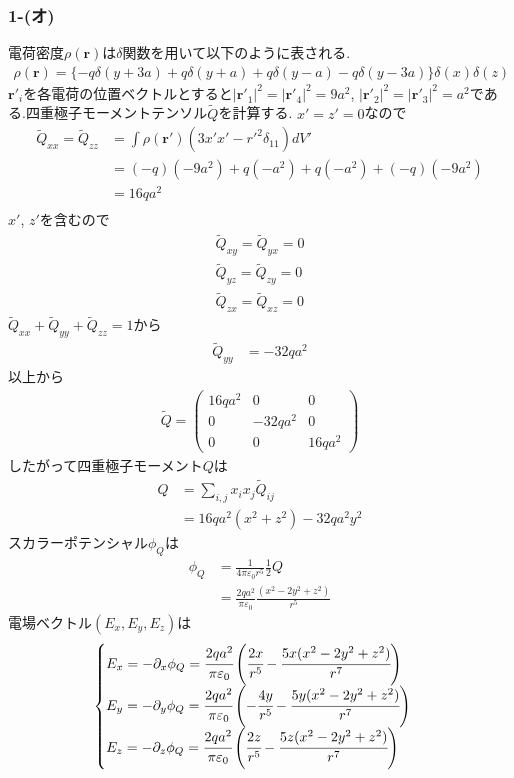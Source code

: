 \subsubsection*{1-(オ)}
電荷密度$\rho({\bm r})$は$\delta$関数を用いて以下のように表される.
\begin{align*}
  \rho({\bm r})=\{-q\delta(y+3a)+q\delta(y+a)+q\delta(y-a)-q\delta(y-3a)\}\delta(x)\delta(z)
\end{align*}
${\bm r'_i}$を各電荷の位置ベクトルとすると$|{\bm r'}_1|^2=|{\bm r'}_4|^2=9a^2$, $|{\bm r'}_2|^2=|{\bm r'}_3|^2=a^2$である.四重極子モーメントテンソル$\tilde{Q}$を計算する.
$x'=z'=0$なので
\begin{align*}
  \tilde{Q}_{xx} =\tilde{Q}_{zz} & =\int\rho({\bm r'})(3x'x'-{r'}^2\delta_{11})dV' \\
                                 & =(-q)(-9a^2)+q(-a^2)+q(-a^2)+(-q)(-9a^2)        \\
                                 & =16qa^2                                         \\
\end{align*}
$x'$, $z'$を含むので
\begin{align*}
  \tilde{Q}_{xy}=\tilde{Q}_{yx}=0 \\
  \tilde{Q}_{yz}=\tilde{Q}_{zy}=0 \\
  \tilde{Q}_{zx}=\tilde{Q}_{xz}=0
\end{align*}
$\tilde{Q}_{xx}+\tilde{Q}_{yy}+\tilde{Q}_{zz}=1$から
\begin{align*}
  \tilde{Q}_{yy} & =-32qa^2
\end{align*}
以上から
\begin{align*}
  \tilde{Q}=\left(
  \begin{array}{ccc}
      16qa^2 & 0       & 0      \\
      0      & -32qa^2 & 0      \\
      0      & 0       & 16qa^2
    \end{array}
  \right)
\end{align*}
したがって四重極子モーメント$Q$は
\begin{align*}
  Q & =\sum_{i,j}x_ix_j\tilde{Q}_{ij} \\
    & =16qa^2(x^2+z^2)-32qa^2y^2
\end{align*}
スカラーポテンシャル$\phi_Q$は
\begin{align*}
  \phi_Q & =\frac{1}{4\pi\varepsilon_0 r^5}\frac{1}{2}Q              \\
         & =\frac{2qa^2}{\pi\varepsilon_0}\frac{(x^2-2y^2+z^2)}{r^5}
\end{align*}
電場ベクトル$(E_x,E_y,E_z)$は
\begin{align*}
  \begin{cases}
    E_x=-\partial_x\phi_Q=\cfrac{2qa^2}{\pi\varepsilon_0}\left(\cfrac{2x}{r^5}-\cfrac{5x(x^2-2y^2+z^2)}{r^7}\right)  \\
    E_y=-\partial_y\phi_Q=\cfrac{2qa^2}{\pi\varepsilon_0}\left(-\cfrac{4y}{r^5}-\cfrac{5y(x^2-2y^2+z^2)}{r^7}\right) \\
    E_z=-\partial_z\phi_Q=\cfrac{2qa^2}{\pi\varepsilon_0}\left(\cfrac{2z}{r^5}-\cfrac{5z(x^2-2y^2+z^2)}{r^7}\right)  \\
  \end{cases}
\end{align*}